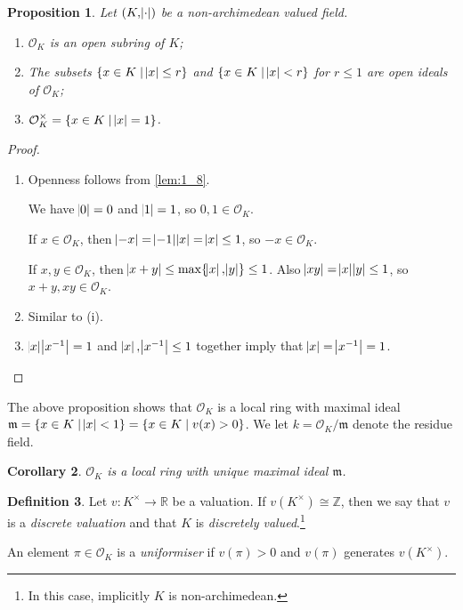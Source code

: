 \documentclass[11pt]{article}
\theoremstyle{definition}
\newtheorem{definition}{Definition}[subsection]
\theoremstyle{plain}
\newtheorem{proposition}[definition]{Proposition}
\newtheorem{corollary}[definition]{Corollary}
\theoremstyle{remark}
\newcommand{\ZZ}{\mathbb{Z}}
\newcommand{\RR}{\mathbb{R}}
\newcommand{\cO}{\mathcal{O}}
\newcommand{\fm}{\mathfrak{m}}
\begin{document}
\begin{proposition}\label{prop:2_3}
    Let $(K, \abs{\cdot})$ be a non-archimedean valued field.
    \begin{enumerate}
        \item $\cO_K$ is an open subring of $K$;
        \item The subsets $\{x \in K \mid \abs{x} \le r\}$ and $\{x \in K \mid \abs{x} < r\}$ for $r \le 1$ are open ideals of $\cO_K$;
        \item $\cO_K^\times = \{x \in K \mid \abs{x} = 1\}$.
    \end{enumerate}
\end{proposition}
\begin{proof}\phantom{}
    \begin{enumerate}
        \item Openness follows from \autoref{lem:1_8}.

            \noindent We have $\abs{0} = 0$ and $\abs{1} = 1$, so $0, 1 \in \cO_K$.

            \noindent If $x \in \cO_K$, then $\abs{-x} = \abs{-1}\abs{x} = \abs{x} \le 1$, so $-x \in \cO_K$.

            \noindent If $x, y \in \cO_K$, then $\abs{x + y} \le \max \{\abs{x}, \abs{y}\} \le 1$. Also $\abs{x y} = \abs{x} \abs{y} \le 1$, so $x + y, x y \in \cO_K$.

        \item Similar to (i).

        \item $\abs{x} \abs{x^{-1}} = 1$ and $\abs{x}, \abs{x^{-1}} \le 1$ together imply that $\abs{x} = \abs{x^{-1}} = 1$. \qedhere
    \end{enumerate}
\end{proof}

\noindent The above proposition shows that $\cO_K$ is a local ring with maximal ideal $\fm = \{x \in K \mid \abs{x} < 1\} = \{x \in K \mid v(x) > 0\}$. We let $k = \cO_K / \fm$ denote the residue field.

\begin{corollary}\label{cor:2_4}
    $\cO_K$ is a local ring with unique maximal ideal $\fm$.
\end{corollary}

\begin{definition}\label{def:2_5}
    Let $v : K^\times \to \RR$ be a valuation. If $v(K^\times) \cong \ZZ$, then we say that $v$ is a \emph{discrete valuation} and that $K$ is \emph{discretely valued}.\footnote{In this case, implicitly $K$ is non-archimedean.}

    An element $\pi \in \cO_K$ is a \emph{uniformiser} if $v(\pi) > 0$ and $v(\pi)$ generates $v(K^\times)$.
\end{definition}
\end{document}
